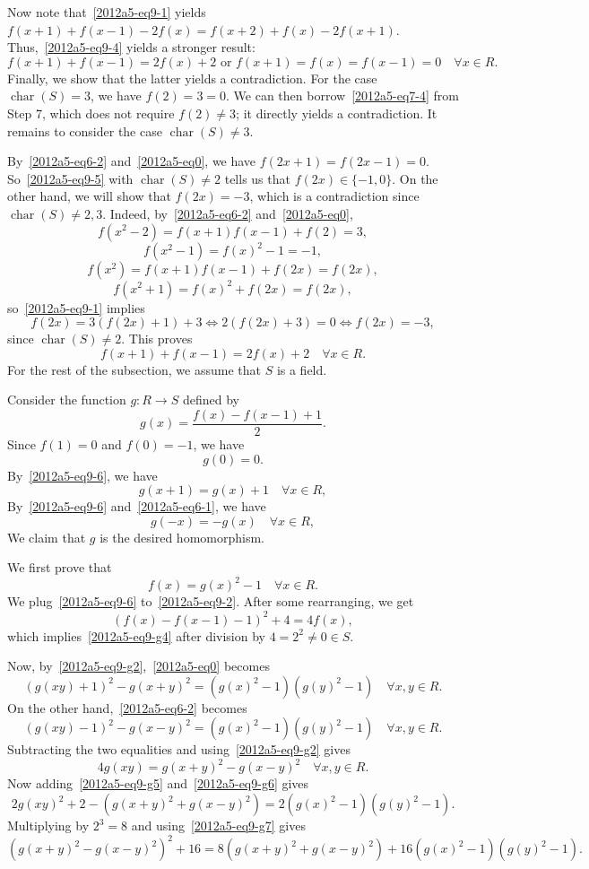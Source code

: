 \documentclass{article}
\DeclareMathOperator{\rchar}{char}
\begin{document}
Now note that~\eqref{2012a5-eq9-1} yields $f(x + 1) + f(x - 1) - 2 f(x) = f(x + 2) + f(x) - 2 f(x + 1)$.
Thus,~\eqref{2012a5-eq9-4} yields a stronger result:
\[ f(x + 1) + f(x - 1) = 2 f(x) + 2 \text{ or } f(x + 1) = f(x) = f(x - 1) = 0 \quad \forall x \in R. \tag{9.5}\label{2012a5-eq9-5} \]
Finally, we show that the latter yields a contradiction.
For the case $\rchar(S) = 3$, we have $f(2) = 3 = 0$.
We can then borrow~\eqref{2012a5-eq7-4} from Step 7, which does not require $f(2) \neq 3$; it directly yields a contradiction.
It remains to consider the case $\rchar(S) \neq 3$.

By~\eqref{2012a5-eq6-2} and~\eqref{2012a5-eq0}, we have $f(2x + 1) = f(2x - 1) = 0$.
So~\eqref{2012a5-eq9-5} with $\rchar(S) \neq 2$ tells us that $f(2x) \in \{-1, 0\}$.
On the other hand, we will show that $f(2x) = -3$, which is a contradiction since $\rchar(S) \neq 2, 3$.
Indeed, by~\eqref{2012a5-eq6-2} and~\eqref{2012a5-eq0},
\[ f(x^2 - 2) = f(x + 1) f(x - 1) + f(2) = 3, \]
\[ f(x^2 - 1) = f(x)^2 - 1 = -1, \]
\[ f(x^2) = f(x + 1) f(x - 1) + f(2x) = f(2x), \]
\[ f(x^2 + 1) = f(x)^2 + f(2x) = f(2x), \]
    so~\eqref{2012a5-eq9-1} implies
\[ f(2x) = 3 (f(2x) + 1) + 3 \iff 2 (f(2x) + 3) = 0 \iff f(2x) = -3, \]
    since $\rchar(S) \neq 2$.
This proves
\[ f(x + 1) + f(x - 1) = 2 f(x) + 2 \quad \forall x \in R. \tag{9.6}\label{2012a5-eq9-6} \]
For the rest of the subsection, we assume that $S$ is a field.

Consider the function $g : R \to S$ defined by
\[ g(x) = \frac{f(x) - f(x - 1) + 1}{2}. \]
Since $f(1) = 0$ and $f(0) = -1$, we have
\[ g(0) = 0. \tag{9.g1}\label{2012a5-eq9-g1} \]
By~\eqref{2012a5-eq9-6}, we have
\[ g(x + 1) = g(x) + 1 \quad \forall x \in R, \tag{9.g2}\label{2012a5-eq9-g2} \]
By~\eqref{2012a5-eq9-6} and~\eqref{2012a5-eq6-1}, we have
\[ g(-x) = -g(x) \quad \forall x \in R, \tag{9.g3}\label{2012a5-eq9-g3} \]
We claim that $g$ is the desired homomorphism.

We first prove that
\[ f(x) = g(x)^2 - 1 \quad \forall x \in R. \tag{9.g4}\label{2012a5-eq9-g4} \]
We plug~\eqref{2012a5-eq9-6} to~\eqref{2012a5-eq9-2}.
After some rearranging, we get
\[ (f(x) - f(x - 1) - 1)^2 + 4 = 4 f(x), \]
    which implies~\eqref{2012a5-eq9-g4} after division by $4 = 2^2 \neq 0 \in S$.

Now, by~\eqref{2012a5-eq9-g2},~\eqref{2012a5-eq0} becomes
\[ (g(xy) + 1)^2 - g(x + y)^2 = (g(x)^2 - 1)(g(y)^2 - 1) \quad \forall x, y \in R. \tag{9.g5}\label{2012a5-eq9-g5} \]
On the other hand,~\eqref{2012a5-eq6-2} becomes
\[ (g(xy) - 1)^2 - g(x - y)^2 = (g(x)^2 - 1)(g(y)^2 - 1) \quad \forall x, y \in R. \tag{9.g6}\label{2012a5-eq9-g6} \]
Subtracting the two equalities and using~\eqref{2012a5-eq9-g2} gives
\[ 4 g(xy) = g(x + y)^2 - g(x - y)^2 \quad \forall x, y \in R. \tag{9.g7}\label{2012a5-eq9-g7} \]
Now adding~\eqref{2012a5-eq9-g5} and~\eqref{2012a5-eq9-g6} gives
\[ 2 g(xy)^2 + 2 - (g(x + y)^2 + g(x - y)^2) = 2 (g(x)^2 - 1)(g(y)^2 - 1). \]
Multiplying by $2^3 = 8$ and using~\eqref{2012a5-eq9-g7} gives
\[ (g(x + y)^2 - g(x - y)^2)^2 + 16 = 8(g(x + y)^2 + g(x - y)^2) + 16 (g(x)^2 - 1)(g(y)^2 - 1). \tag{9.g8}\label{2012a5-eq9-g8} \]
\end{document}
